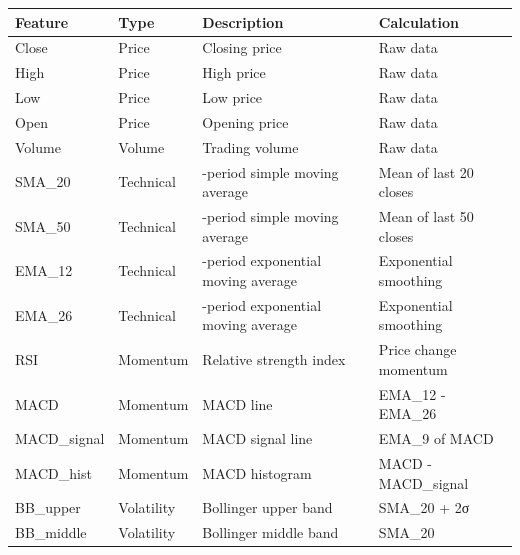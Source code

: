 \begin{longtable}[]{@{}
  >{\raggedright\arraybackslash}p{}
  >{\raggedright\arraybackslash}p{}
  >{\raggedright\arraybackslash}p{}
  >{\raggedright\arraybackslash}p{}@{}}
\toprule\noalign{}
\begin{minipage}[b]{\linewidth}\raggedright
Feature
\end{minipage} & \begin{minipage}[b]{\linewidth}\raggedright
Type
\end{minipage} & \begin{minipage}[b]{\linewidth}\raggedright
Description
\end{minipage} & \begin{minipage}[b]{\linewidth}\raggedright
Calculation
\end{minipage} \\
\midrule\noalign{}
\endhead
\bottomrule\noalign{}
\endlastfoot
Close & Price & Closing price & Raw data \\
High & Price & High price & Raw data \\
Low & Price & Low price & Raw data \\
Open & Price & Opening price & Raw data \\
Volume & Volume & Trading volume & Raw data \\
SMA\_20 & Technical & 20-period simple moving average & Mean of last 20
closes \\
SMA\_50 & Technical & 50-period simple moving average & Mean of last 50
closes \\
EMA\_12 & Technical & 12-period exponential moving average & Exponential
smoothing \\
EMA\_26 & Technical & 26-period exponential moving average & Exponential
smoothing \\
RSI & Momentum & Relative strength index & Price change momentum \\
MACD & Momentum & MACD line & EMA\_12 - EMA\_26 \\
MACD\_signal & Momentum & MACD signal line & EMA\_9 of MACD \\
MACD\_hist & Momentum & MACD histogram & MACD - MACD\_signal \\
BB\_upper & Volatility & Bollinger upper band & SMA\_20 + 2σ \\
BB\_middle & Volatility & Bollinger middle band & SMA\_20 \\

\end{longtable}
